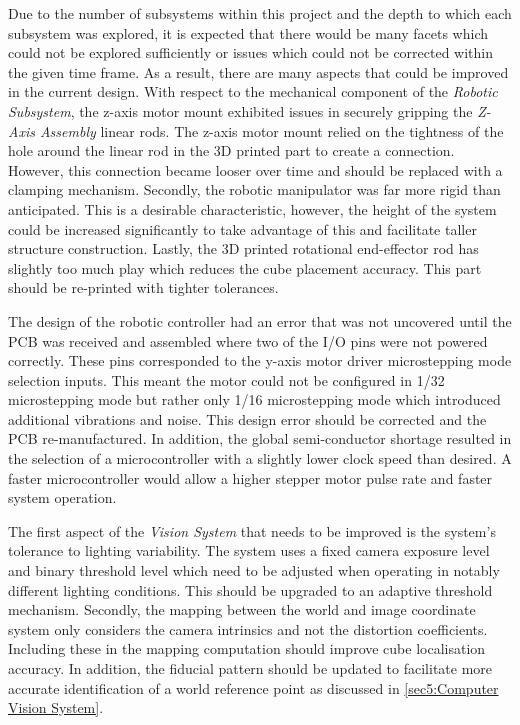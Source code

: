 Due to the number of subsystems within this project and the depth to which each subsystem was explored, it is expected that there would be many facets which could not be explored sufficiently or issues which could not be corrected within the given time frame. As a result, there are many aspects that could be improved in the current design. With respect to the mechanical component of the \textit{Robotic Subsystem}, the z-axis motor mount exhibited issues in securely gripping the \textit{Z-Axis Assembly} linear rods. The z-axis motor mount relied on the tightness of the hole around the linear rod in the 3D printed part to create a connection. However, this connection became looser over time and should be replaced with a clamping mechanism. Secondly, the robotic manipulator was far more rigid than anticipated. This is a desirable characteristic, however, the height of the system could be increased significantly to take advantage of this and facilitate taller structure construction. Lastly, the 3D printed rotational end-effector rod has slightly too much play which reduces the cube placement accuracy. This part should be re-printed with tighter tolerances.

The design of the robotic controller had an error that was not uncovered until the PCB was received and assembled where two of the I/O pins were not powered correctly. These pins corresponded to the y-axis motor driver microstepping mode selection inputs. This meant the motor could not be configured in 1/32 microstepping mode but rather only 1/16 microstepping mode which introduced additional vibrations and noise. This design error should be corrected and the PCB re-manufactured. In addition, the global semi-conductor shortage resulted in the selection of a microcontroller with a slightly lower clock speed than desired. A faster microcontroller would allow a higher stepper motor pulse rate and faster system operation.

The first aspect of the \textit{Vision System} that needs to be improved is the system's tolerance to lighting variability. The system uses a fixed camera exposure level and binary threshold level which need to be adjusted when operating in notably different lighting conditions. This should be upgraded to an adaptive threshold mechanism. Secondly, the mapping between the world and image coordinate system only considers the camera intrinsics and not the distortion coefficients. Including these in the mapping computation should improve cube localisation accuracy. In addition, the fiducial pattern should be updated to facilitate more accurate identification of a world reference point as discussed in \ref{sec5:Computer Vision System}.


